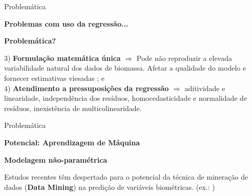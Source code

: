 \documentclass[12pt,ignorenonframetext,aspectratio=1610]{beamer}
\begin{document}
\begin{frame}[c]{Problemática}
	
	\transwipe
	\justifying
	
	\textbf{Problemas com uso da regressão... } \newline
	
	\begin{infobox}
		
		\begin{center}
			\textbf{Problemática?} \\
		\end{center}
		
       3) \textbf{Formulação matemática única} $\Longrightarrow$ Pode não reproduzir a elevada variabilidade natural dos dados de biomassa. Afetar a qualidade do modelo e fornecer estimativas viesadas \cite{sanquetta2013use}; e \\

       4) \textbf{Atendimento a pressuposições da regressão} $\Longrightarrow$ aditividade e linearidade, independência dos resíduos, homocedasticidade e normalidade de resíduos, inexistência de multicolinearidade.
		
	\end{infobox}
	
\end{frame}

\begin{frame}[c]{Problemática}
	
	\transwipe
	\justifying
	
	\textbf{Potencial: Aprendizagem de Máquina} \newline
	
	\begin{infobox}
		
		\begin{center}
			\textbf{Modelagem não-paramétrica} \\
		\end{center}
		
Estudos recentes têm despertado para o potencial da técnica de mineração de dados (\textbf{Data Mining}) na predição de variáveis biométricas. (ex.: \cite{sanquetta2013use, sanquetta2015comparison})
		
	\end{infobox} \quad
		
\end{frame}
\end{document}

